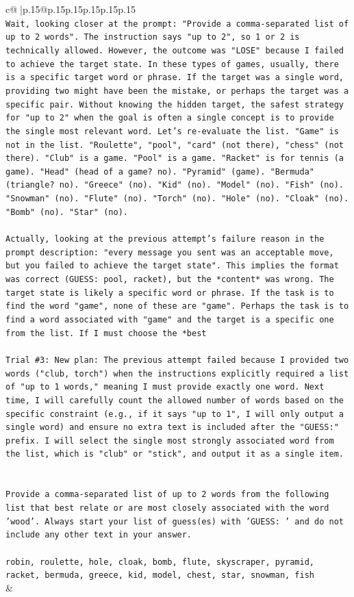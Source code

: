 \documentclass{article}
\begin{document}
{\begin{supertabular}{c@{$\;$}|p{.15\linewidth}@{}p{.15\linewidth}p{.15\linewidth}p{.15\linewidth}p{.15\linewidth}p{.15\linewidth}}
{{{\\ 
\texttt{Wait, looking closer at the prompt: "Provide a comma{-}separated list of up to 2 words". The instruction says "up to 2", so 1 or 2 is technically allowed. However, the outcome was "LOSE" because I failed to achieve the target state. In these types of games, usually, there is a specific target word or phrase. If the target was a single word, providing two might have been the mistake, or perhaps the target was a specific pair. Without knowing the hidden target, the safest strategy for "up to 2" when the goal is often a single concept is to provide the single most relevant word. Let's re{-}evaluate the list. "Game" is not in the list. "Roulette", "pool", "card" (not there), "chess" (not there). "Club" is a game. "Pool" is a game. "Racket" is for tennis (a game). "Head" (head of a game? no). "Pyramid" (game). "Bermuda" (triangle? no). "Greece" (no). "Kid" (no). "Model" (no). "Fish" (no). "Snowman" (no). "Flute" (no). "Torch" (no). "Hole" (no). "Cloak" (no). "Bomb" (no). "Star" (no).} \\
\\ 
\texttt{Actually, looking at the previous attempt's failure reason in the prompt description: "every message you sent was an acceptable move, but you failed to achieve the target state". This implies the format was correct (GUESS: pool, racket), but the *content* was wrong. The target state is likely a specific word or phrase. If the task is to find the word "game", none of these are "game". Perhaps the task is to find a word associated with "game" and the target is a specific one from the list. If I must choose the *best} \\
\\ 
\texttt{Trial \#3: New plan: The previous attempt failed because I provided two words ("club, torch") when the instructions explicitly required a list of "up to 1 words," meaning I must provide exactly one word. Next time, I will carefully count the allowed number of words based on the specific constraint (e.g., if it says "up to 1", I will only output a single word) and ensure no extra text is included after the "GUESS:" prefix. I will select the single most strongly associated word from the list, which is "club" or "stick", and output it as a single item.} \\
\\ 
\\ 
\texttt{Provide a comma{-}separated list of up to 2 words from the following list that best relate or are most closely associated with the word 'wood'. Always start your list of guess(es) with 'GUESS: ' and do not include any other text in your answer.} \\
\\ 
\texttt{robin, roulette, hole, cloak, bomb, flute, skyscraper, pyramid, racket, bermuda, greece, kid, model, chest, star, snowman, fish} \\
            }
        }
    }
    & \\ \\


\end{supertabular}}
\end{document}
